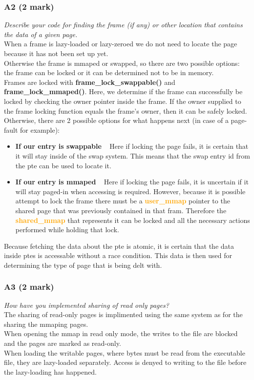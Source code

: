 \documentclass{report}
\newcommand{\question}[1]{\textit{#1} \ }
\newcommand{\bullpara}[2]{\item \textbf{#1} \ #2}
\newcommand{\fun}[1]{\textcolor{Emerald}{\textbf{#1}}}
\newcommand{\struct}[1]{\textcolor{orange}{\textbf{#1}}}
\newcommand{\compitem}[1]{\begin{itemize}\setlength\itemsep{-0.1em}#1\end{itemize}}
\begin{document}
			\subsubsection*{A2 (2 mark)}
				\question{Describe your code for finding the frame (if any) or 
				other location that contains the data of a given page.} 
				\\
				When a frame is lazy-loaded or lazy-zeroed we do not need 
				to locate the page because it has not been set up yet. \\
				Otherwise the frame is mmaped or swapped, so there are two 
				possible options: the frame can be locked or it can be 
				determined not to be in memory. \\
				Frames are locked with \fun{frame\_lock\_swappable()} and 
				\fun{frame\_lock\_mmaped()}. Here, we determine if the frame can
				successfully be locked by checking the owner pointer inside the 
				frame. If the owner supplied to the frame locking function 
				equals the frame's owner, then it can be safely locked.
				Otherwise, there are 2 possible options for what happens 
				next (in case of a page-fault for example):
				\compitem{
					\bullpara{If our entry is swappable}{
						Here if locking the page fails, it is certain that
						it will stay inside of the swap system. This means that
						the swap entry id from the pte can be used to locate it.
					}
					\bullpara{If our entry is mmaped}{
						Here if locking the page fails, it is uncertain
						if it will stay paged-in when accessing is required. 
						However, because it is possible attempt to lock the
						frame there must be a \struct{user\_mmap} pointer
						to the shared page that was previously contained in that fram.
						Therefore the \struct{shared\_mmap} that represents it can be locked
						and all the necessary actions performed while holding that lock.
					}
				}
				Because fetching the data about the pte is atomic,
				it is certain that the data inside ptes is accessable without a 
				race condition. This data is then used for determining the type 
				of page that is being delt with.

			\subsubsection*{A3 (2 mark)}
				\question{How have you implemented sharing of read only pages?}
				\\ The sharing of read-only pages is implimented using the same
				system as for the sharing the mmaping pages.
				\\ When opening the mmap in read only mode, the writes to the 
				file are blocked and the pages are marked as read-only.
				\\ When loading the writable pages, where bytes must be read from 
				the executable file, they are lazy-loaded separately. Access is 
				denyed to writing to the file before the lazy-loading has happened.
			
\end{document}
